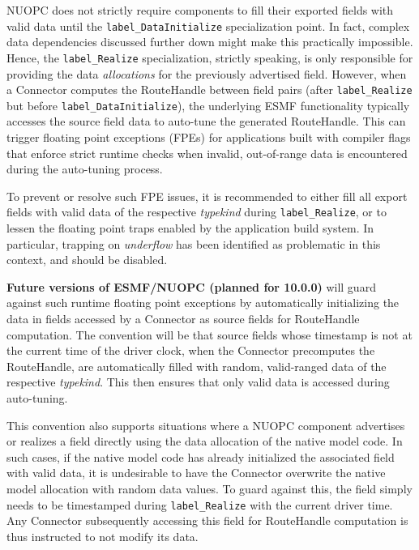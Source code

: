 %

\label{DataInit}

NUOPC does not strictly require components to fill their exported fields with valid data until the {\tt label\_DataInitialize} specialization point. In fact, complex data dependencies discussed further down might make this practically impossible. Hence, the {\tt label\_Realize} specialization, strictly speaking, is only responsible for providing the data {\em allocations} for the previously advertised field. However, when a Connector computes the RouteHandle between field pairs (after {\tt label\_Realize} but before {\tt label\_DataInitialize}), the underlying ESMF functionality typically accesses the source field data to auto-tune the generated RouteHandle. This can trigger floating point exceptions (FPEs) for applications built with compiler flags that enforce strict runtime checks when invalid, out-of-range data is encountered during the auto-tuning process.

To prevent or resolve such FPE issues, it is recommended to either fill all export fields with valid data of the respective {\em typekind} during {\tt label\_Realize}, or to lessen the floating point traps enabled by the application build system. In particular, trapping on {\em underflow} has been identified as problematic in this context, and should be disabled.

{\bf Future versions of ESMF/NUOPC (planned for 10.0.0)} will guard against such runtime floating point exceptions by automatically initializing the data in fields accessed by a Connector as source fields for RouteHandle computation. The convention will be that source fields whose timestamp is not at the current time of the driver clock, when the Connector precomputes the RouteHandle, are automatically filled with random, valid-ranged data of the respective {\em typekind}. This then ensures that only valid data is accessed during auto-tuning.

This convention also supports situations where a NUOPC component advertises or realizes a field directly using the data allocation of the native model code. In such cases, if the native model code has already initialized the associated field with valid data, it is undesirable to have the Connector overwrite the native model allocation with random data values. To guard against this, the field simply needs to be timestamped during {\tt label\_Realize} with the current driver time. Any Connector subsequently accessing this field for RouteHandle computation is thus instructed to not modify its data.

